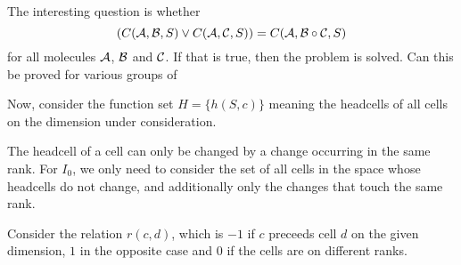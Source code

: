 \documentclass[12pt]{article}
\begin{document}
The interesting question is whether
$$
    ( C({\mathcal A}, {\mathcal B}, S) \vee C({\mathcal A}, {\mathcal C}, S) )
	= C({\mathcal A}, {\mathcal B} \circ {\mathcal C}, S)
$$
for all molecules ${\mathcal A}$, ${\mathcal B}$ and ${\mathcal C}$.
If that is true, then the problem is solved.
Can this be proved for various groups of

\pagebreak


Now, consider the function set $H = \{ h(S, c) \}$ 
meaning the headcells of all cells
on the dimension under consideration.

The headcell of a cell can only be changed by a change
occurring in the same rank.
For $I_0$, we only need to consider the set of all cells in 
the space whose headcells do not change, and additionally only
the changes that touch the same rank. 

\pagebreak


Consider the relation $r(c, d)$, which is $-1$ if $c$ preceeds
cell $d$ on the given dimension, $1$ in the opposite case
and $0$ if the cells are on different ranks.
\end{document}
